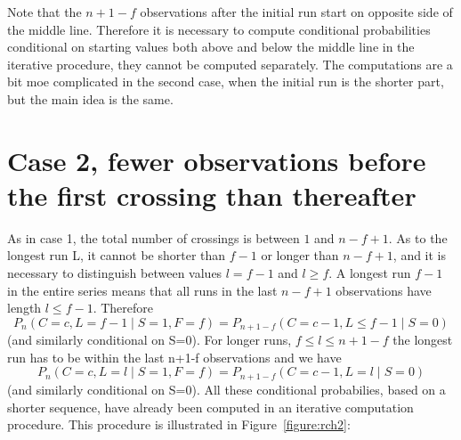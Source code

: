Note that the $n+1-f$ observations after the initial run start on opposite side of the middle line. Therefore it is necessary to compute conditional probabilities conditional on starting values both above and below the middle line in the iterative procedure, they cannot be computed separately. The computations are a bit moe complicated in the second case, when the initial run is the shorter part, but the main idea is the same.

\section{Case 2, fewer observations before the first crossing than thereafter}

As in case 1, the total number of crossings is between $1$ and $n-f+1$. As to the longest run L, it cannot be shorter than $f-1$ or longer than $n-f+1$, and it is necessary to distinguish between values $l=f-1$ and $l \geq f$. A longest run $f-1$ in the entire series means that all runs in the last $n-f+1$ observations have length $l \leq f-1$. Therefore $$P_n (C=c,L=f-1 \mid S=1,F=f) = P_{n+1-f} (C=c-1,L \leq f-1 \mid S=0)$$
(and similarly conditional on S=0). For longer runs, $f \leq l \leq n+1-f$ the longest run has to be within the last n+1-f observations and we have $$P_n (C=c,L=l \mid S=1,F=f) = P_{n+1-f} (C=c-1,L=l \mid S=0)$$
(and similarly conditional on S=0). All these conditional probabilies, based on a shorter sequence, have already been computed in an iterative computation procedure. This procedure is illustrated in Figure~\ref{figure:rch2}:

